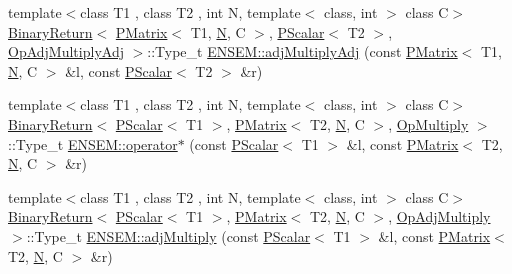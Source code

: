 \begin{DoxyCompactItemize}
\item 
{\footnotesize template$<$class T1 , class T2 , int N, template$<$ class, int $>$ class C$>$ }\\\mbox{\hyperlink{structENSEM_1_1BinaryReturn}{Binary\+Return}}$<$ \mbox{\hyperlink{classENSEM_1_1PMatrix}{P\+Matrix}}$<$ T1, \mbox{\hyperlink{adat__devel_2lib_2hadron_2operator__name__util_8cc_a7722c8ecbb62d99aee7ce68b1752f337}{N}}, C $>$, \mbox{\hyperlink{classENSEM_1_1PScalar}{P\+Scalar}}$<$ T2 $>$, \mbox{\hyperlink{structENSEM_1_1OpAdjMultiplyAdj}{Op\+Adj\+Multiply\+Adj}} $>$\+::Type\+\_\+t \mbox{\hyperlink{group__primmatrix_gada4da32758440b83d445ae4a0e14297e}{E\+N\+S\+E\+M\+::adj\+Multiply\+Adj}} (const \mbox{\hyperlink{classENSEM_1_1PMatrix}{P\+Matrix}}$<$ T1, \mbox{\hyperlink{adat__devel_2lib_2hadron_2operator__name__util_8cc_a7722c8ecbb62d99aee7ce68b1752f337}{N}}, C $>$ \&l, const \mbox{\hyperlink{classENSEM_1_1PScalar}{P\+Scalar}}$<$ T2 $>$ \&r)
\item 
{\footnotesize template$<$class T1 , class T2 , int N, template$<$ class, int $>$ class C$>$ }\\\mbox{\hyperlink{structENSEM_1_1BinaryReturn}{Binary\+Return}}$<$ \mbox{\hyperlink{classENSEM_1_1PScalar}{P\+Scalar}}$<$ T1 $>$, \mbox{\hyperlink{classENSEM_1_1PMatrix}{P\+Matrix}}$<$ T2, \mbox{\hyperlink{adat__devel_2lib_2hadron_2operator__name__util_8cc_a7722c8ecbb62d99aee7ce68b1752f337}{N}}, C $>$, \mbox{\hyperlink{structENSEM_1_1OpMultiply}{Op\+Multiply}} $>$\+::Type\+\_\+t \mbox{\hyperlink{group__primmatrix_ga2f9521924540b40d00ad4aa1606bfb22}{E\+N\+S\+E\+M\+::operator$\ast$}} (const \mbox{\hyperlink{classENSEM_1_1PScalar}{P\+Scalar}}$<$ T1 $>$ \&l, const \mbox{\hyperlink{classENSEM_1_1PMatrix}{P\+Matrix}}$<$ T2, \mbox{\hyperlink{adat__devel_2lib_2hadron_2operator__name__util_8cc_a7722c8ecbb62d99aee7ce68b1752f337}{N}}, C $>$ \&r)
\item 
{\footnotesize template$<$class T1 , class T2 , int N, template$<$ class, int $>$ class C$>$ }\\\mbox{\hyperlink{structENSEM_1_1BinaryReturn}{Binary\+Return}}$<$ \mbox{\hyperlink{classENSEM_1_1PScalar}{P\+Scalar}}$<$ T1 $>$, \mbox{\hyperlink{classENSEM_1_1PMatrix}{P\+Matrix}}$<$ T2, \mbox{\hyperlink{adat__devel_2lib_2hadron_2operator__name__util_8cc_a7722c8ecbb62d99aee7ce68b1752f337}{N}}, C $>$, \mbox{\hyperlink{structENSEM_1_1OpAdjMultiply}{Op\+Adj\+Multiply}} $>$\+::Type\+\_\+t \mbox{\hyperlink{group__primmatrix_ga01de3db0f09195f592339c9241bd4692}{E\+N\+S\+E\+M\+::adj\+Multiply}} (const \mbox{\hyperlink{classENSEM_1_1PScalar}{P\+Scalar}}$<$ T1 $>$ \&l, const \mbox{\hyperlink{classENSEM_1_1PMatrix}{P\+Matrix}}$<$ T2, \mbox{\hyperlink{adat__devel_2lib_2hadron_2operator__name__util_8cc_a7722c8ecbb62d99aee7ce68b1752f337}{N}}, C $>$ \&r)

\end{DoxyCompactItemize}
